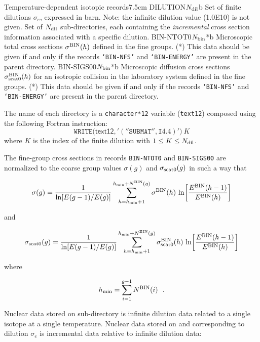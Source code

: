 \begin{DescriptionEnregistrement}{Temperature-dependent isotopic records}{7.5cm}
\label{tabl:tabiso202}
\RealEnr
  {DILUTION}{$N_{\rm dil}$}{b}
  {Set of finite dilutions $\sigma_e$, expressed in barn. Note: the infinite dilution value (1.0E10) is not given.}
\DirVar
  {}
  {Set of $N_{\rm dil}$ sub-directories, each containing the {\sl incremental} cross section information
   associated with a specific dilution.}
\OptRealEnr
  {BIN-NTOT0}{$N_{\rm bin}$}{*}{b}
  {Microscopic total cross sections $\sigma^{\rm BIN}(h)$ defined in the fine groups. (*) This data should be given if and
  only if the records {\tt `BIN-NFS'} and {\tt `BIN-ENERGY'} are present in the parent directory.}
\OptRealEnr
  {BIN-SIGS00}{$N_{\rm bin}$}{*}{b}
  {Microscopic diffusion cross sections $\sigma^{\rm BIN}_{\rm scat0}(h)$ for an isotropic collision in the laboratory system defined
  in the fine groups. (*) This data should be given if and only if the records {\tt `BIN-NFS'}
  and {\tt `BIN-ENERGY'} are present in the parent directory.}
\end{DescriptionEnregistrement}

The name of each  directory is a {\tt character*12} variable ({\tt text12})
composed using the following Fortran instruction:
$$
\mathtt{WRITE(}\mathsf{text12}\mathtt{,'(''SUBMAT'',I4.4)')}\: K
$$
where $K$ is the index of the finite dilution with $1 \leq K \le N_{\rm dil}$.

\vskip 0.2cm

The fine-group cross sections in records {\tt BIN-NTOT0} and {\tt BIN-SIGS00}
are normalized to the coarse group values $\sigma(g)$ and $\sigma_{\rm scat0}(g)$ in such a way that

$$\sigma(g)={1 \over {\rm ln}[E(g-1) / E(g)]} \sum_{h=h_{\rm min}+1}^{h_{\rm min}+N^{\rm BIN}(g)} {\sigma^{\rm BIN}(h)} \ {\rm ln} \biggl[{E^{\rm BIN}(h-1)\over E^{\rm BIN}(h)} \biggr]$$

\noindent and

$$\sigma_{\rm scat0}(g)={1 \over {\rm ln}[E(g-1) / E(g)]} \sum_{h=h_{\rm min}+1}^{h_{\rm min}+N^{\rm BIN}(g)} {\sigma^{\rm BIN}_{\rm scat0}(h)} \ {\rm ln} \biggl[{E^{\rm BIN}(h-1)\over E^{\rm BIN}(h)} \biggr]$$

\noindent where

$$h_{\rm min}=\sum_{i=1}^{g-1}{N^{\rm BIN}(i)} \ \ .$$

\vskip 0.2cm

Nuclear data stored on sub-directory  is infinite dilution data related to a single isotope
at a single temperature. Nuclear
data stored on  and corresponding to dilution $\sigma_e$ is incremental
data relative to infinite dilution data:

